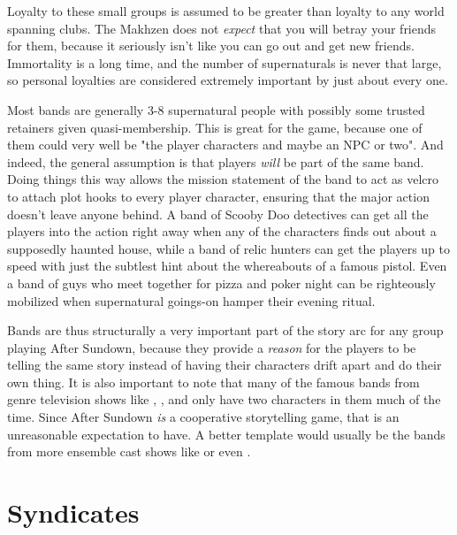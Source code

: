 Loyalty to these small groups is assumed to be greater than loyalty to any world spanning clubs. The Makhzen does not \textit{expect} that you will betray your friends for them, because it seriously isn't like you can go out and get new friends. Immortality is a long time, and the number of supernaturals is never that large, so personal loyalties are considered extremely important by just about every one.

Most bands are generally 3-8 supernatural people with possibly some trusted retainers given quasi-membership. This is great for the game, because one of them could very well be "the player characters and maybe an NPC or two". And indeed, the general assumption is that players \textit{will} be part of the same band. Doing things this way allows the mission statement of the band to act as velcro to attach plot hooks to every player character, ensuring that the major action doesn't leave anyone behind. A band of Scooby Doo detectives can get all the players into the action right away when any of the characters finds out about a supposedly haunted house, while a band of relic hunters can get the players up to speed with just the subtlest hint about the whereabouts of a famous pistol. Even a band of guys who meet together for pizza and poker night can be righteously mobilized when supernatural goings-on hamper their evening ritual.

Bands are thus structurally a very important part of the story arc for any group playing After Sundown, because they provide a \textit{reason} for the players to be telling the same story instead of having their characters drift apart and do their own thing. It is also important to note that many of the famous bands from genre television shows like , , and  only have two characters in them much of the time. Since After Sundown \textit{is} a cooperative storytelling game, that is an unreasonable expectation to have. A better template would usually be the bands from more ensemble cast shows like  or even .

\section{Syndicates}

